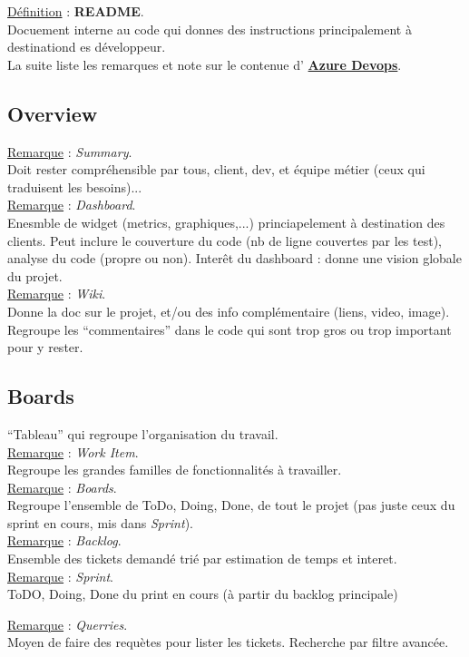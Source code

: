 \documentclass[a4paper,12pt,twoside]{article}
\newcommand{\urlcolor}{magenta}  %
\newcommand{\keycolor}{purple} %
\newcommand{\rem}[2]{\noindent\underline{Remarque} : \textit{#1}.\\ \indent #2}
\newcommand{\defi}[2]{\noindent\underline{Définition} : \textbf{#1}.\\ \indent #2}
\newcommand{\keyref}[2]{\hypersetup{urlcolor=\keycolor} \href{#1}{\textbf{#2}}\hypersetup{urlcolor=\urlcolor}}
\begin{document}
\defi{README}{Docuement interne au code qui donnes des instructions principalement à destinationd es développeur.}\\

La suite liste les remarques et note sur le contenue d'\keyref{https://azure.microsoft.com/fr-fr/services/devops/#overview}{Azure Devops}.

\subsection{Overview}

\rem{Summary}{Doit rester compréhensible par tous, client, dev, et équipe métier (ceux qui traduisent les besoins)...}\\

\rem{Dashboard}{Enesmble de widget (metrics, graphiques,...) princiapelement à destination des clients. Peut inclure le couverture du code (nb de ligne couvertes par les test), analyse du code (propre ou non). Interêt du dashboard : donne une vision globale du projet.}\\

\rem{Wiki}{Donne la doc sur le projet, et/ou des info complémentaire (liens, video, image). Regroupe les ``commentaires'' dans le code qui sont trop gros ou trop important pour y rester.}\\

\subsection{Boards}

``Tableau'' qui regroupe l'organisation du travail.\\

\rem{Work Item}{Regroupe les grandes familles de fonctionnalités à travailler.}\\

\rem{Boards}{Regroupe l'ensemble de ToDo, Doing, Done, de tout le projet (pas juste ceux du sprint en cours, mis dans \textit{Sprint}).}\\

\rem{Backlog}{Ensemble des tickets demandé trié par estimation de temps et interet.}\\

\rem{Sprint}{ToDO, Doing, Done du print en cours (à partir du backlog principale)}

\rem{Querries}{Moyen de faire des requètes pour lister les tickets. Recherche par filtre avancée.}\\
\end{document}
